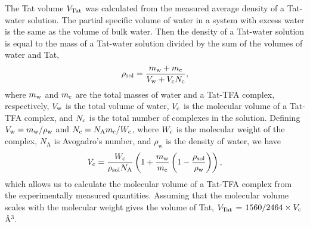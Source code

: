 The Tat volume $V_\textrm{Tat}$ was calculated from the measured average density of a 
Tat-water solution. 
The partial specific volume of water in a system with excess water is the same 
as the volume of bulk water. Then the density
of a Tat-water solution is equal to the mass of a Tat-water solution divided
by the sum of the volumes of water and Tat, 
\begin{equation}
  \rho_\textrm{sol} = \frac{m_\textrm{w}+m_\textrm{c}}{V_\textrm{w}+V_\textrm{c}N_\textrm{c}},
\end{equation}
where $m_\textrm{w}$ and $m_\textrm{c}$
are the total masses of water and a Tat-TFA complex, respectively, 
$V_\textrm{w}$ is the total volume of 
water, $V_\textrm{c}$ is the molecular volume of a Tat-TFA complex, and $N_\textrm{c}$ is the total number 
of complexes in the solution. 
Defining $V_\textrm{w}=m_\textrm{w}/\rho_\textrm{w}$ 
and $N_\textrm{c}=N_\textrm{A}m_\textrm{c}/W_\textrm{c}$, 
where $W_\textrm{c}$ is the molecular weight of the complex, 
$N_\textrm{A}$ is Avogadro's number,
and $\rho_\textrm{w}$ is the density of water, we have
\begin{equation}
  V_\textrm{c} = \frac{W_\textrm{c}}{\rho_\textrm{sol}N_\textrm{A}} \left( 
        1 + \frac{m_\textrm{w}}{m_\textrm{c}}\left(1-\frac{\rho_\textrm{sol}}{\rho_\textrm{w}}\right) 
        \right),
\end{equation}
which allows us to calculate the molecular volume of a Tat-TFA complex 
from the experimentally measured quantities. 
Assuming that the molecular
volume scales with the molecular weight gives the volume of Tat, 
$V_\textrm{Tat}$ = $1560/2464\times V_\textrm{c}$ \AA$^3$. 


